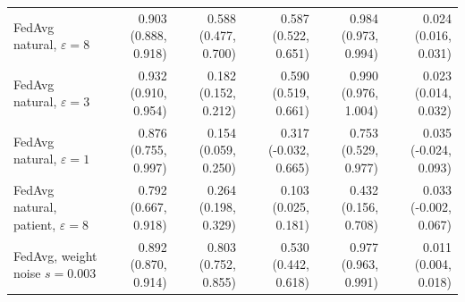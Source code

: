 \begin{table}[H]
{\begin{tabular}{lrrrrr}
FedAvg natural, $\varepsilon=8$ & 0.903 (0.888, 0.918) & 0.588 (0.477, 0.700) & 0.587 (0.522, 0.651) & 0.984 (0.973, 0.994) & 0.024 (0.016, 0.031) \\
FedAvg natural, $\varepsilon=3$ & 0.932 (0.910, 0.954) & 0.182 (0.152, 0.212) & 0.590 (0.519, 0.661) & 0.990 (0.976, 1.004) & 0.023 (0.014, 0.032) \\
FedAvg natural, $\varepsilon=1$ & 0.876 (0.755, 0.997) & 0.154 (0.059, 0.250) & 0.317 (-0.032, 0.665) & 0.753 (0.529, 0.977) & 0.035 (-0.024, 0.093) \\
FedAvg natural, patient, $\varepsilon=8$ & 0.792 (0.667, 0.918) & 0.264 (0.198, 0.329) & 0.103 (0.025, 0.181) & 0.432 (0.156, 0.708) & 0.033 (-0.002, 0.067) \\
FedAvg, weight noise $s=0.003$ & 0.892 (0.870, 0.914) & 0.803 (0.752, 0.855) & 0.530 (0.442, 0.618) & 0.977 (0.963, 0.991) & 0.011 (0.004, 0.018) \\
\bottomrule
\end{tabular}}
\par{}
\end{table}

